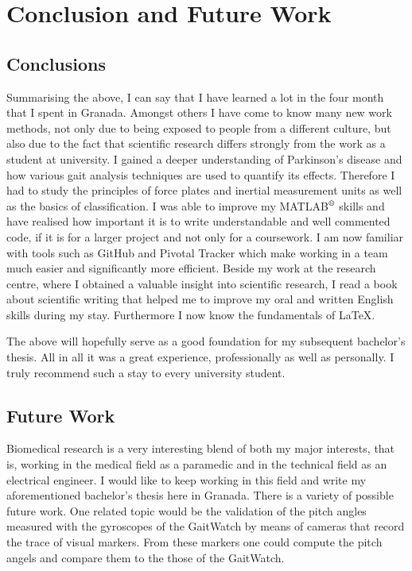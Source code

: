 \chapter{Conclusion and Future Work}
\label{ch:Conclusion and Future Work}

\section{Conclusions}

Summarising the above, I can say that I have learned a lot in the four month that I spent in Granada. Amongst others I have come to know many new work methods, not only due to being exposed to people from a different culture, but also due to the fact that scientific research differs strongly from the work as a student at university. I gained a deeper understanding of Parkinson's disease and how various gait analysis techniques are used to quantify its effects. Therefore I had to study the principles of force plates and inertial measurement units as well as the basics of classification. I was able to improve my MATLAB$\textsuperscript{\textregistered}$ skills and have realised how important it is to write understandable and well commented code, if it is for a larger project and not only for a coursework. I am now familiar with tools such as GitHub and Pivotal Tracker which make working in a team much easier and significantly more efficient.  Beside my work at the research centre, where I obtained a valuable insight into scientific research, I read a book about scientific writing that helped me to improve my oral and written English skills during my stay. Furthermore I now know the fundamentals of \LaTeX{}.

The above will hopefully serve as a good foundation for my subsequent bachelor's thesis.  All in all it was a great experience, professionally as well as personally. I truly recommend such a stay to every university student.

\section{Future Work}

Biomedical research is a very interesting blend of both my major interests, that is, working in the medical field as a paramedic and  in the technical field as an electrical engineer. I would like to keep working in this field and write my aforementioned bachelor's thesis here in Granada. There is a variety of possible future work. One related topic would be the validation of the pitch angles measured with the gyroscopes of the GaitWatch by means of cameras that record the trace of visual markers. From these markers one could compute the pitch angels and compare them to the those of the GaitWatch. 